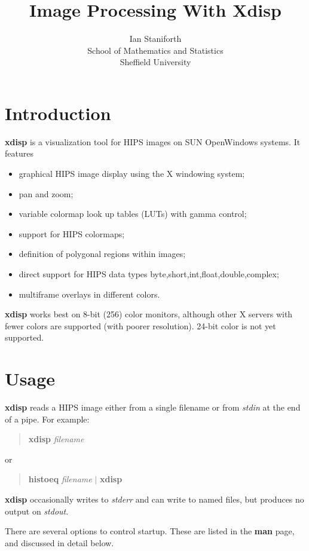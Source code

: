 


\title{Image Processing With Xdisp}
\author{Ian Staniforth\\
School of Mathematics and Statistics\\
Sheffield University}
\maketitle

\tableofcontents

\section{Introduction}
{\bf xdisp} is a visualization tool for HIPS images on SUN OpenWindows systems. It features
\begin{itemize}
\item graphical HIPS image display using the X windowing system;
\item pan and zoom;
\item variable colormap look up tables (LUTs) with gamma control;
\item support for HIPS colormaps;
\item definition of polygonal regions within images;
\item direct support for HIPS data types byte,short,int,float,double,complex;
\item multiframe overlays in different colors.
\end{itemize}
{\bf xdisp} works best on 8-bit (256) color monitors, although other X servers with fewer colors are supported (with poorer resolution). 24-bit color is not yet supported.
\section{Usage}
{\bf xdisp} reads a HIPS image either from a single filename or from {\it stdin\/} at the end of a pipe. For example:
\begin{quote}
{\bf xdisp} {\it filename}
\end{quote}
or
\begin{quote}
{\bf histoeq} {\it filename} $\mid$ {\bf xdisp}
\end{quote}
{\bf xdisp} occasionally writes to {\it stderr\/} and can write to named files, but produces no output on {\it stdout\/}.

There are several options to control startup. These are listed in the {\bf man} page, and discussed in detail below.

